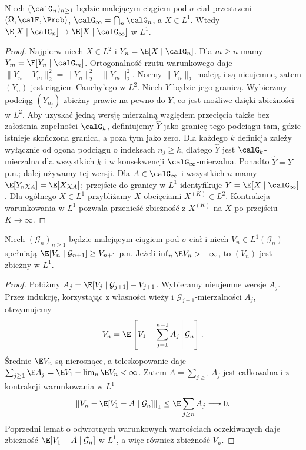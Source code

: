 \begin{lemat}
Niech $(\calG_n)_{n\ge1}$ będzie malejącym ciągiem
pod-$\sigma$-ciał przestrzeni $(\Omega,\calF,\Prob)$,
$\calG_\infty=\bigcap_n\calG_n$, a $X\in L^1$.
Wtedy
$\E[X\mid\calG_n]\to\E[X\mid\calG_\infty]$ w $L^1$.
\end{lemat}
\begin{proof}
Najpierw niech $X\in L^2$ i $Y_n=\E[X\mid\calG_n]$.
Dla $m\ge n$ mamy $Y_m=\E[Y_n\mid\calG_m]$.
Ortogonalność rzutu warunkowego daje
$\|Y_n-Y_m\|_2^2=\|Y_n\|_2^2-\|Y_m\|_2^2$.
Normy $\|Y_n\|_2$ maleją i są nieujemne, zatem
$(Y_n)$ jest ciągiem Cauchy'ego w $L^2$. Niech $Y$
będzie jego granicą. Wybierzmy podciąg $(Y_{n_j})$ zbieżny prawie na pewno
do $Y$, co jest możliwe dzięki zbieżności w $L^2$.
Aby uzyskać jedną wersję mierzalną względem
przecięcia także bez założenia zupełności $\calG_k$,
definiujemy $\widehat Y$ jako granicę tego podciągu
tam, gdzie istnieje skończona granica, a poza tym
jako zero. Dla każdego $k$ definicja zależy wyłącznie
od ogona podciągu o indeksach $n_j\ge k$, dlatego
$\widehat Y$ jest $\calG_k$-mierzalna dla wszystkich $k$
i w konsekwencji $\calG_\infty$-mierzalna.
Ponadto $\widehat Y=Y$ p.n.; dalej używamy tej wersji.
Dla $A\in\calG_\infty$ i wszystkich $n$ mamy
$\E[Y_n\chi_A]=\E[X\chi_A]$; przejście do granicy
w $L^1$ identyfikuje $Y=\E[X\mid\calG_\infty]$.
Dla ogólnego $X\in L^1$ przybliżamy $X$ obcięciami
$X^{(K)}\in L^2$. Kontrakcja warunkowania w $L^1$
pozwala przenieść zbieżność z $X^{(K)}$ na $X$ po
przejściu $K\to\infty$.
\end{proof}

\begin{lemat}
\label{lem:reverse-submart-l1}
Niech $(\mathcal G_n)_{n\ge1}$ będzie malejącym
ciągiem pod-$\sigma$-ciał i niech
$V_n\in L^1(\mathcal G_n)$ spełniają
$\E[V_n\mid\mathcal G_{n+1}]\ge V_{n+1}$ p.n.
Jeżeli $\inf_n\E V_n>-\infty$, to $(V_n)$
jest zbieżny w $L^1$.
\end{lemat}
\begin{proof}
Połóżmy $A_j=\E[V_j\mid\mathcal G_{j+1}]-V_{j+1}$.
Wybieramy nieujemne wersje $A_j$.
Przez indukcję, korzystając z własności wieży
i $\mathcal G_{j+1}$-mierzalności $A_j$, otrzymujemy
\[
V_n=\E\left[V_1-\sum_{j=1}^{n-1}A_j
\,\middle|\,\mathcal G_n\right].
\]
Średnie $\E V_n$ są nierosnące, a teleskopowanie daje
$\sum_{j\ge1}\E A_j=\E V_1-\lim_n\E V_n<\infty$.
Zatem $A=\sum_{j\ge1}A_j$ jest całkowalna
i z kontrakcji warunkowania w $L^1$
\[
\left\|V_n-\E[V_1-A\mid\mathcal G_n]\right\|_1
\le\E\sum_{j\ge n}A_j\longrightarrow0.
\]
Poprzedni lemat o odwrotnych warunkowych wartościach
oczekiwanych daje zbieżność
$\E[V_1-A\mid\mathcal G_n]$ w $L^1$,
a więc również zbieżność $V_n$.
\end{proof}

